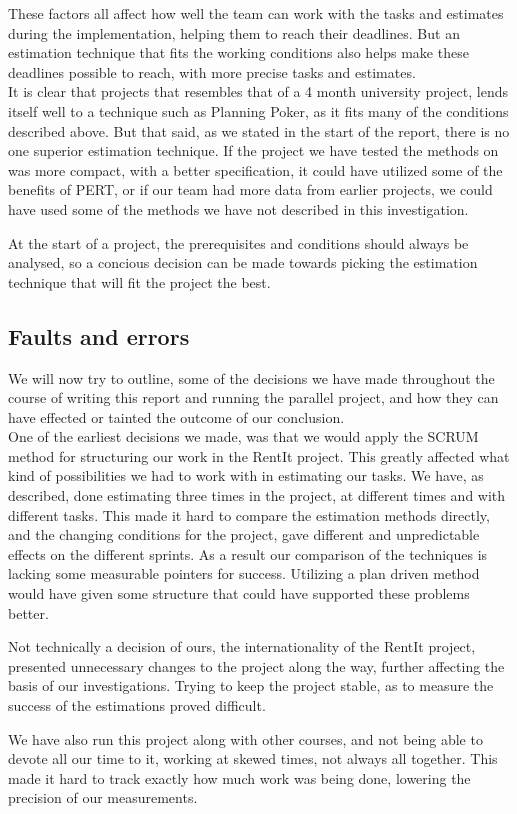 These factors all affect how well the team can work with the tasks and estimates during the implementation, helping them to reach their deadlines. But an estimation technique that fits the working conditions also helps make these deadlines possible to reach, with more precise tasks and estimates.\\

It is clear that projects that resembles that of a 4 month university project, lends itself well to a technique such as Planning Poker, as it fits many of the conditions described above. But that said, as we stated in the start of the report, there is no one superior estimation technique. If the project we have tested the methods on was more compact, with a better specification, it could have utilized some of the benefits of PERT, or if our team had more data from earlier projects, we could have used some of the methods we have not described in this investigation. 

At the start of a project, the prerequisites and conditions should always be analysed, so a concious decision can be made towards picking the estimation technique that will fit the project the best.

\subsection{Faults and errors}
We will now try to outline, some of the decisions we have made throughout the course of writing this report and running the parallel project, and how they can have effected or tainted the outcome of our conclusion.\\

One of the earliest decisions we made, was that we would apply the SCRUM method for structuring our work in the RentIt project. This greatly affected what kind of possibilities we had to work with in estimating our tasks. We have, as described, done estimating three times in the project, at different times and with different tasks. This made it hard to compare the estimation methods directly, and the changing conditions for the project, gave different and unpredictable effects on the different sprints. As a result our comparison of the techniques is lacking some measurable pointers for success. Utilizing a plan driven method would have given some structure that could have supported these problems better.

Not technically a decision of ours, the internationality of the RentIt project, presented unnecessary changes to the project along the way, further affecting the basis of our investigations. Trying to keep the project stable, as to measure the success of the estimations proved difficult.

We have also run this project along with other courses, and not being able to devote all our time to it, working at skewed times, not always all together. This made it hard to track exactly how much work was being done, lowering the precision of our measurements.


